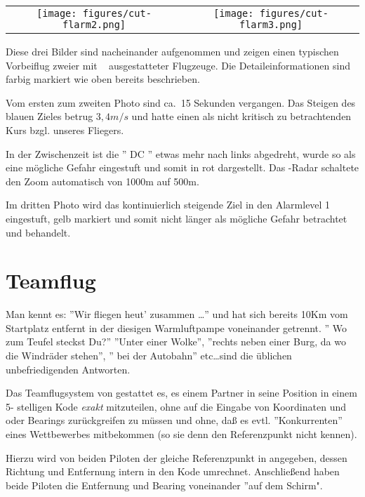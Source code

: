 \begin{center}
\begin{tabular}{c c}
\texttt{[image: figures/cut-flarm2.png]}&
\texttt{[image: figures/cut-flarm3.png]}\\
\end{tabular}
\end{center}
Diese drei Bilder sind nacheinander aufgenommen und zeigen einen typischen Vorbeiflug zweier
mit \fl~ ausgestatteter Flugzeuge. Die Detaileinformationen sind farbig markiert wie oben bereits
beschrieben.

Vom ersten zum zweiten Photo sind ca.\ 15 Sekunden vergangen.
Das Steigen des blauen Zieles betrug $3,4m/s$ und hatte einen als nicht
kritisch zu betrachtenden Kurs bzgl. unseres Fliegers.

In der Zwischenzeit  ist die '' DC '' etwas mehr nach links abgedreht, wurde so als
eine mögliche Gefahr eingestuft und somit in rot dargestellt.
Das \fl-Radar schaltete den Zoom automatisch von 1000m auf 500m.

Im dritten Photo wird das kontinuierlich steigende Ziel in den Alarmlevel 1
eingestuft, gelb markiert und somit nicht länger als mögliche Gefahr
betrachtet und behandelt.


\section{Teamflug}

Man kennt es: ''Wir fliegen heut' zusammen \dots'' und hat sich bereits 10Km vom
Startplatz entfernt in der diesigen Warmluftpampe voneinander getrennt. '' Wo zum Teufel steckst Du?''
''Unter einer Wolke'', ''rechts neben einer Burg, da wo die Windräder stehen'', '' bei der Autobahn'' etc\dots sind die üblichen
unbefriedigenden Antworten.


Das Teamflugsystem von \xc gestattet es, es einem Partner in \xc seine Position
  in einem 5- stelligen Kode \textsl{exakt} mitzuteilen, ohne auf die Eingabe von Koordinaten und
  oder Bearings zurückgreifen zu müssen und ohne, daß es evtl. ''Konkurrenten'' eines Wettbewerbes mitbekommen
  (so sie denn den Referenzpunkt nicht kennen).

  Hierzu wird von beiden Piloten der gleiche  Referenzpunkt in \xc angegeben,
  dessen Richtung und Entfernung \xc intern in den Kode umrechnet.
  Anschließend haben beide Piloten die Entfernung und Bearing voneinander ''auf dem Schirm".

